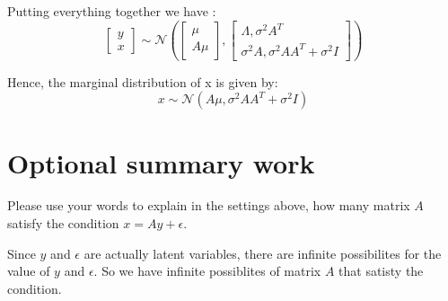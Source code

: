\documentclass{article}
\newenvironment{answer}{\par\color{ForestGreen}}{\par}
\begin{document}
\begin{answer}
Putting everything together we have :
$$\begin{bmatrix} y \\ x \end{bmatrix} \sim \mathcal{N} (\begin{bmatrix} \mu \\ A\mu \end{bmatrix}, \begin{bmatrix} \Lambda, \sigma^2A^T \\ \sigma^2A, \sigma^2AA^T + \sigma^2I\end{bmatrix})$$

Hence, the marginal distribution of x is given by: $$x \sim \mathcal{N}(A\mu, \sigma^2AA^T + \sigma^2I)$$

\end{answer}

\section{Optional summary work}
Please use your words to explain in the settings above, how many matrix $A$ satisfy the condition $x = Ay + \epsilon $.

\begin{answer}
    Since $y$ and $\epsilon$ are actually latent variables, there are infinite possibilites for the value of $y$ and $\epsilon$. So we have infinite possiblites of matrix $A$ that satisty the condition.
\end{answer}
\end{document}
